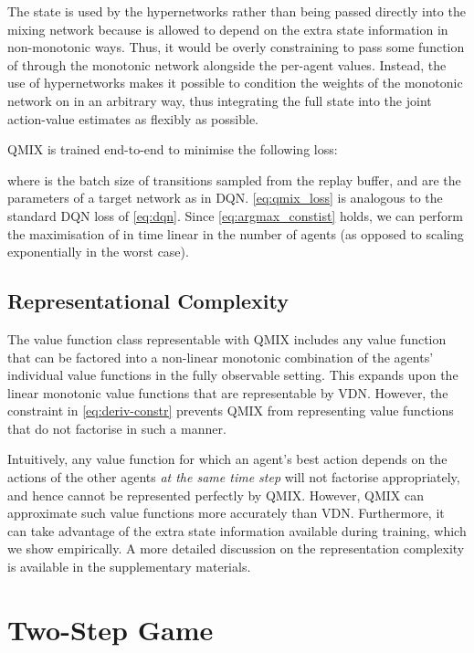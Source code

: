\documentclass{article}
\begin{document}
The state is used by the hypernetworks rather than being passed directly into the mixing network because  is allowed to depend on the extra state 
information in non-monotonic ways. Thus, it would be overly constraining to pass some function of  through the monotonic network alongside the 
per-agent values.
Instead, the use of hypernetworks makes it possible to condition the 
weights of the monotonic network on  in an arbitrary way, thus 
integrating the full state  into the joint action-value estimates as 
flexibly as possible.


QMIX is trained end-to-end to minimise the following loss:
 
where  is the batch size of transitions sampled from the replay buffer,  and  are the parameters of a target network as in DQN. 
\eqref{eq:qmix_loss} is analogous to the standard DQN loss of \eqref{eq:dqn}. Since \eqref{eq:argmax_constist} holds, we can perform the maximisation of  in time linear in the number of agents (as opposed to scaling exponentially in the worst case). 

\subsection{Representational Complexity}

The value function class representable with QMIX includes any value function that can be factored into a non-linear monotonic combination of the agents' individual value functions in the fully observable setting. 
This expands upon the linear monotonic value functions that are representable by VDN. 
However, the constraint in \eqref{eq:deriv-constr} prevents QMIX from representing value functions that do not factorise in such a manner. 




Intuitively, any value function for which an agent's best action depends on the actions of the other agents \emph{at the same time step} will not factorise appropriately, and hence cannot be represented perfectly by QMIX. However, QMIX can approximate such value functions more accurately than VDN. Furthermore, it can take advantage of the extra state information available during training, which we show empirically. A more detailed discussion on the representation complexity is available in the supplementary materials.


 \section{Two-Step Game}
\label{sec:two_step_game}
\end{document}
